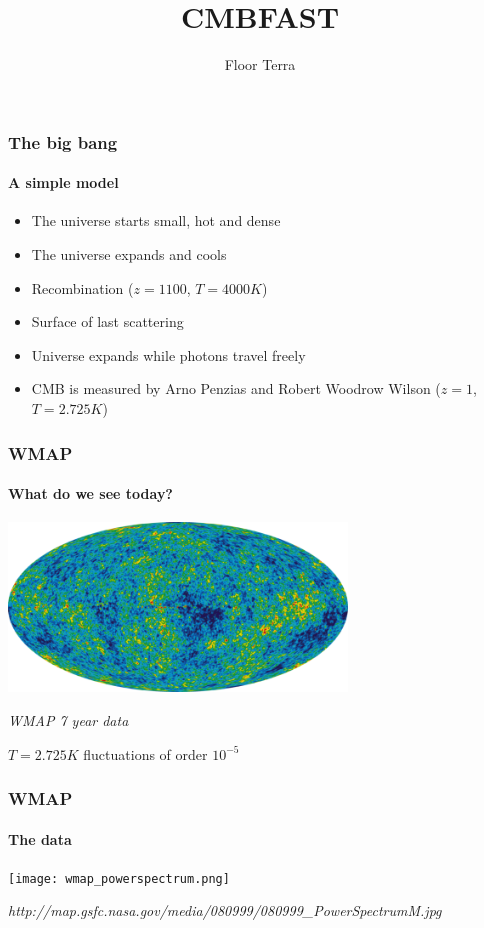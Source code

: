 \documentclass{beamer}
\title{CMBFAST}
\author{Floor Terra}
\begin{document}
	\begin{frame}
		\titlepage
	\end{frame} 
	
	\begin{frame}
		\frametitle{The big bang}
		\framesubtitle{A simple model}
		\begin{itemize}
			\item The universe starts small, hot and dense
			\item The universe expands and cools
			\item Recombination ($z=1100$, $T=4000K$)
			\item Surface of last scattering
			\item Universe expands while photons travel freely
			\item CMB is measured by Arno Penzias and Robert Woodrow Wilson ($z=1$, $T=2.725K$)
		\end{itemize}
	\end{frame}
	
	\begin{frame}
		\frametitle{WMAP}
		\framesubtitle{What do we see today?}
		\begin{center}
			\includegraphics[width=90mm]{WMAP.png}

			\emph{WMAP 7 year  data}

			$T=2.725K$ fluctuations of order $10^{-5}$
		\end{center}
	\end{frame}
	
	\begin{frame}
		\frametitle{WMAP}
		\framesubtitle{The data}
		\begin{center}
			\texttt{[image: wmap\_powerspectrum.png]}

			\emph{http://map.gsfc.nasa.gov/media/080999/080999\_PowerSpectrumM.jpg}
		\end{center}
	\end{frame}
	
\end{document}
